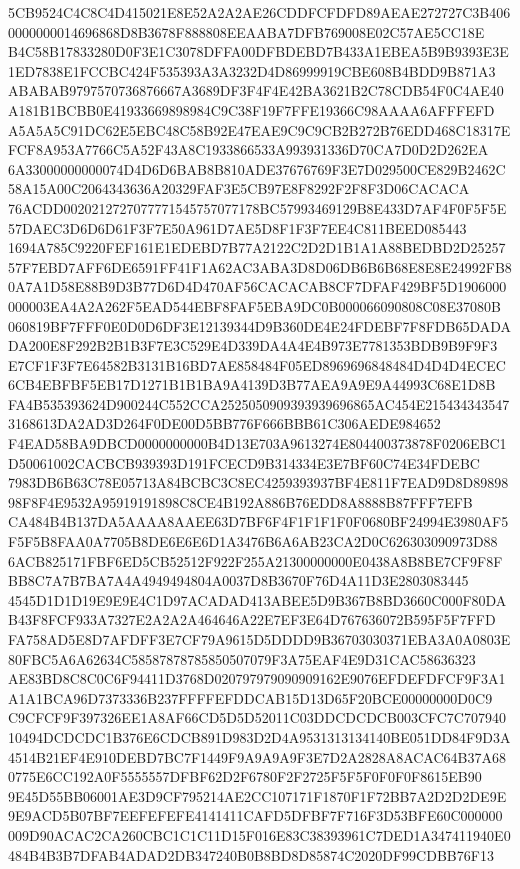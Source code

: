 \documentclass[UTF8,fontset=fandol,zihao=-4,a4paper]{ctexart}
\begin{document}
{{5CB9524C4C8C4D415021E8E52A2A2AE26CDDFCFDFD89AEAE272727C3B4060000000014696868D8B3678F888808EEAABA7DFB769008E02C57AE5CC18E
B4C58B17833280D0F3E1C3078DFFA00DFBDEBD7B433A1EBEA5B9B9393E3E1ED7838E1FCCBC424F535393A3A3232D4D86999919CBE608B4BDD9B871A3
ABABAB9797570736876667A3689DF3F4F4E42BA3621B2C78CDB54F0C4AE40A181B1BCBB0E41933669898984C9C38F19F7FFE19366C98AAAA6AFFFEFD
A5A5A5C91DC62E5EBC48C58B92E47EAE9C9C9CB2B272B76EDD468C18317EFCF8A953A7766C5A52F43A8C1933866533A993931336D70CA7D0D2D262EA
6A33000000000074D4D6D6BAB8B810ADE37676769F3E7D029500CE829B2462C58A15A00C2064343636A20329FAF3E5CB97E8F8292F2F8F3D06CACACA
76ACDD0020212727077771545757077178BC57993469129B8E433D7AF4F0F5F5E57DAEC3D6D6D61F3F7E50A961D7AE5D8F1F3F7EE4C811BEED085443
1694A785C9220FEF161E1EDEBD7B77A2122C2D2D1B1A1A88BEDBD2D2525757F7EBD7AFF6DE6591FF41F1A62AC3ABA3D8D06DB6B6B68E8E8E24992FB8
0A7A1D58E88B9D3B77D6D4D470AF56CACACAB8CF7DFAF429BF5D1906000000003EA4A2A262F5EAD544EBF8FAF5EBA9DC0B000066090808C08E37080B
060819BF7FFF0E0D0D6DF3E12139344D9B360DE4E24FDEBF7F8FDB65DADADA200E8F292B2B1B3F7E3C529E4D339DA4A4E4B973E7781353BDB9B9F9F3
E7CF1F3F7E64582B3131B16BD7AE858484F05ED8969696848484D4D4D4ECEC6CB4EBFBF5EB17D1271B1B1BA9A4139D3B77AEA9A9E9A44993C68E1D8B
FA4B535393624D900244C552CCA2525050909393939696865AC454E2154343435473168613DA2AD3D264F0DE00D5BB776F666BBB61C306AEDE984652
F4EAD58BA9DBCD0000000000B4D13E703A9613274E804400373878F0206EBC1D50061002CACBCB939393D191FCECD9B314334E3E7BF60C74E34FDEBC
7983DB6B63C78E05713A84BCBC3C8EC4259393937BF4E811F7EAD9D8D8989898F8F4E9532A95919191898C8CE4B192A886B76EDD8A8888B87FFF7EFB
CA484B4B137DA5AAAA8AAEE63D7BF6F4F1F1F1F0F0680BF24994E3980AF5F5F5B8FAA0A7705B8DE6E6E6D1A3476B6A6AB23CA2D0C626303090973D88
6ACB825171FBF6ED5CB52512F922F255A21300000000E0438A8B8BE7CF9F8FBB8C7A7B7BA7A4A4949494804A0037D8B3670F76D4A11D3E2803083445
4545D1D1D19E9E9E4C1D97ACADAD413ABEE5D9B367B8BD3660C000F80DAB43F8FCF933A7327E2A2A2A464646A22E7EF3E64D767636072B595F5F7FFD
FA758AD5E8D7AFDFF3E7CF79A9615D5DDDD9B36703030371EBA3A0A0803E80FBC5A6A62634C58587878785850507079F3A75EAF4E9D31CAC58636323
AE83BD8C8C0C6F94411D3768D020797979090909162E9076EFDEFDFCF9F3A1A1A1BCA96D7373336B237FFFFEFDDCAB15D13D65F20BCE00000000D0C9
C9CFCF9F397326EE1A8AF66CD5D5D52011C03DDCDCDCB003CFC7C70794010494DCDCDC1B376E6CDCB891D983D2D4A9531313134140BE051DD84F9D3A
4514B21EF4E910DEBD7BC7F1449F9A9A9A9F3E7D2A2828A8ACAC64B37A680775E6CC192A0F5555557DFBF62D2F6780F2F2725F5F5F0F0F0F8615EB90
9E45D55BB06001AE3D9CF795214AE2CC107171F1870F1F72BB7A2D2D2DE9E9E9ACD5B07BF7EEFEFEFE4141411CAFD5DFBF7F716F3D53BFE60C000000
009D90ACAC2CA260CBC1C1C11D15F016E83C38393961C7DED1A347411940E0484B4B3B7DFAB4ADAD2DB347240B0B8BD8D85874C2020DF99CDBB76F13
}}
\end{document}
